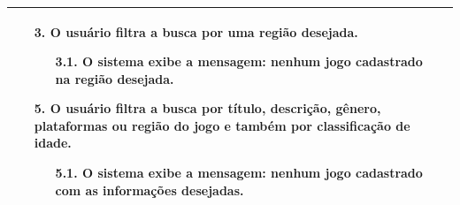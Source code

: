 \documentclass[a4paper,11pt]{article}
\begin{document}
\begin{table}[H]
\begin{tabularx}{\textwidth}{|l|X|}
\begin{itemize}
				\item[3.] O usuário filtra a busca por uma região desejada.											\begin{itemize}
					\item[3.1.] O sistema exibe a mensagem: nenhum jogo cadastrado na região desejada.
				\end{itemize}
				
				\item[5.] O usuário filtra a busca por título, descrição, gênero, plataformas ou região do jogo e também por classificação de idade.
				\begin{itemize}
					\item[5.1.] O sistema exibe a mensagem: nenhum jogo cadastrado com as informações desejadas.
				\end{itemize}
			\end{itemize} \\ \hline
			
		\end{tabularx}
\end{table}
\end{document}
